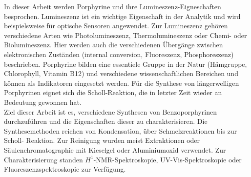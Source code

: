 In dieser Arbeit werden Porphyrine und ihre Lumineszenz-Eigneschaften besprochen. Lumineszenz ist ein wichtige Eigenschaft in der Analytik und wird beispielsweise für optische Sensoren angewendet. Zur Lumineszenz gehören verschiedene Arten wie Photolumineszenz, Thermolumineszenz oder Chemi- oder Biolumineszenz. Hier werden auch die verschiedenen Übergänge zwischen elektronischen Zuständen (internal conversion, Fluoreszenz, Phosphoreszenz) beschrieben.
Porphyrine bilden eine essentiele Gruppe in  der Natur (Hämgruppe, Chlorophyll, Vitamin B12) und verschiedene wissenschaftlichen Bereichen und können als Indikatoren eingesetzt werden. Für die Synthese von längerwelligen Porphyrinen eignet sich die Scholl-Reaktion, die in letzter Zeit wieder an Bedeutung gewonnen hat.
\\Ziel dieser Arbeit ist es, verschiedene Synthesen von Benzoporphyrinen durchzuführen und die Eigenschaften dieser zu charakterisieren.
Die Synthesemethoden reichen von Kondensation, über Schmelzreaktionen bis zur Scholl- Reaktion. Zur Reinigung wurden meist Extraktionen oder Säulenchromatographie mit Kieselgel oder Aluminiumoxid verwendet. Zur Charakterisierung standen $H^1$-NMR-Spektroskopie, UV-Vis-Spektroskopie oder Fluoreszenzspektroskopie zur Verfügung.